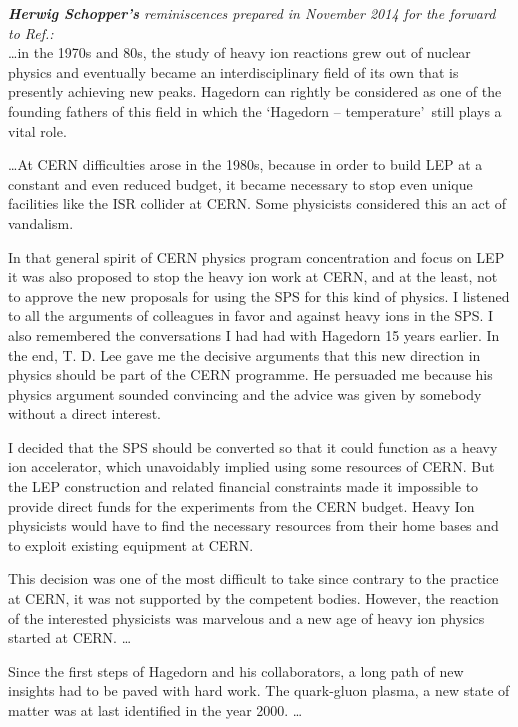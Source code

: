 \begin{mdframed}[linecolor=gray,roundcorner=12pt,backgroundcolor=GreenYellow!15,linewidth=1pt,leftmargin=0cm,rightmargin=0cm,topline=true,bottomline=true,skipabove=12pt]
\noindent \textit{{\bf Herwig Schopper\rq s}\label{Schopper2014} reminiscences prepared in November 2014 for the forward to Ref.\cite{Rafelski:2016hnq}:}\\
\ldots in the 1970s and 80s, the study of heavy ion reactions grew out of nuclear physics and eventually became an interdisciplinary field of its own that is presently achieving new peaks. Hagedorn can rightly be considered as one of the founding fathers of this field in which the \lq Hagedorn – temperature\rq\ still plays a vital role. 

\ldots At CERN difficulties arose in the 1980s, because in order to build LEP at a constant and even reduced budget, it became necessary to stop even unique facilities like the ISR collider at CERN. Some physicists considered this an act of vandalism. 

In that general spirit of CERN physics program concentration and focus on LEP it was also proposed to stop the heavy ion work at CERN, and at the least, not to approve the new proposals for using the SPS for this kind of physics. I listened to all the arguments of colleagues in favor and against heavy ions in the SPS. I also remembered the conversations I had had with Hagedorn 15 years earlier. In the end, T. D. Lee\label{SchopperRem} gave me the decisive arguments that this new direction in physics should be part of the CERN programme. He persuaded me because his physics argument sounded convincing and the advice was given by somebody without a direct interest.

I decided that the SPS should be converted so that it could function as a heavy ion accelerator, which unavoidably implied using some resources of CERN. But the LEP construction and related financial constraints made it impossible to provide direct funds for the experiments from the CERN budget. Heavy Ion physicists would have to find the necessary resources from their home bases and to exploit existing equipment at CERN.

This decision was one of the most difficult to take since contrary to the practice at CERN, it was not supported by the competent bodies. However, the reaction of the interested physicists was marvelous and a new age of heavy ion physics started at CERN. \ldots

Since the first steps of Hagedorn and his collaborators, a long path of new insights had to be paved with hard work. The quark-gluon plasma, a new state of matter was at last identified in the year 2000. \ldots\\
\end{mdframed}



